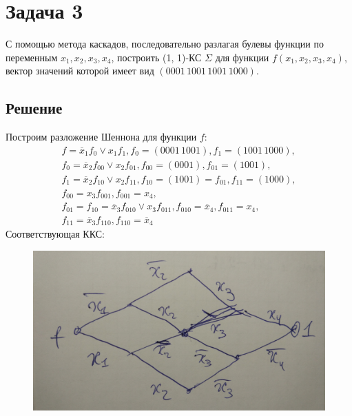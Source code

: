 \documentclass[11pt]{article}
\def\zall{\setcounter{Def}{0}\setcounter{lem}{0}\setcounter{cnsqnc}{0}\setcounter{th}{0}\setcounter{Cmt}{0}\setcounter{equation}{0}\setcounter{stnmt}{0}}
\newcounter{Def}\setcounter{Def}{0}
\newcounter{lem}\setcounter{lem}{0}
\newcounter{th}\setcounter{th}{0}
\newcounter{cnsqnc}\setcounter{cnsqnc}{0}
\newcounter{Cmt}\setcounter{Cmt}{0}
\newcounter{stnmt}\setcounter{stnmt}{0}
\begin{document}
\section{Задача 3}
\label{sec:org3b2b376}
\zall
С помощью метода каскадов, последовательно разлагая булевы функции по переменным \(x_1, x_2, x_3, x_4\), построить (1, 1)-КС \(\Sigma\) для функции \(f(x_1, x_2, x_3, x_4)\), вектор значений которой имеет вид \((0001\, 1001\, 1001\, 1000)\).
\subsection{Решение}
\label{sec:orgb5b01ab}
Построим разложение Шеннона для функции \(f\):
\begin{gather*}
f = \overline{x}_1f_0\lor x_1f_1, f_0 = (0001\,1001), f_1 = (1001\,1000), \\
f_0 = \overline{x}_2f_{00}\lor x_2f_{01}, f_{00} = (0001), f_{01} = (1001), \\
f_1 = \overline{x}_2f_{10}\lor x_2f_{11}, f_{10} = (1001) = f_{01}, f_{11} = (1000), \\
f_{00} = x_3f_{001}, f_{001} = x_4, \\
f_{01} = f_{10} = \overline{x}_3f_{010}\lor x_3f_{011}, f_{010} = \overline{x}_4, f_{011} = x_4, \\
f_{11} = \overline{x}_3f_{110}, f_{110} = \overline{x}_4
\end{gather*}
Соответствующая ККС:
\begin{figure}[h]
\centering
\begin{center}
\includegraphics[width=.9\linewidth]{./scheme2.jpg}
\end{center}
\end{figure}
\pagebreak
\end{document}
